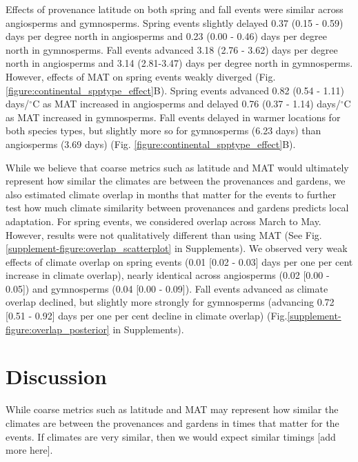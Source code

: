 \documentclass{article}
\begin{document}
Effects of provenance latitude on both spring and fall events were similar across angiosperms and gymnosperms.
Spring events slightly delayed 0.37 (0.15 - 0.59) days per degree north in angiosperms and 0.23 (0.00 - 0.46) days per degree north in gymnosperms. Fall events advanced 3.18 (2.76 - 3.62) days per degree north in angiosperms and 3.14 (2.81-3.47) days per degree north in gymnosperms.
However, effects of MAT on spring events weakly diverged (Fig.\ref{figure:continental_spptype_effect}B). Spring events advanced 0.82 (0.54 - 1.11) days/$^{\circ}$C as MAT increased in angiosperms and delayed 0.76 (0.37 - 1.14) days/$^{\circ}$C as MAT increased in gymnosperms. Fall events delayed in warmer locations for both species types, but slightly more so for gymnosperms (6.23 days) than angiosperms (3.69 days) (Fig. \ref{figure:continental_spptype_effect}B).

While we believe that coarse metrics such as latitude and MAT would ultimately represent how similar the climates are between the provenances and gardens, we also estimated climate overlap in months that matter for the events to further test how much climate similarity between provenances and gardens predicts local adaptation. For spring events, we considered overlap across March to May. However, results were not qualitatively different than using MAT (See Fig. \ref{supplement-figure:overlap_scatterplot} in Supplements). We observed very weak effects of climate overlap on spring events (0.01 [0.02 - 0.03] days per one per cent increase in climate overlap), nearly identical across angiosperms (0.02 [0.00 - 0.05]) and gymnosperms (0.04 [0.00 - 0.09]). Fall events advanced as climate overlap declined, but slightly more strongly for gymnosperms (advancing 0.72 [0.51 - 0.92] days per one per cent decline in climate overlap) (Fig.\ref{supplement-figure:overlap_posterior} in Supplements).


\section{Discussion}
While coarse metrics such as latitude and MAT may represent how similar the climates are between the provenances and gardens in times that matter for the events. If climates are very similar, then we would expect similar timings [add more here].
\end{document}
